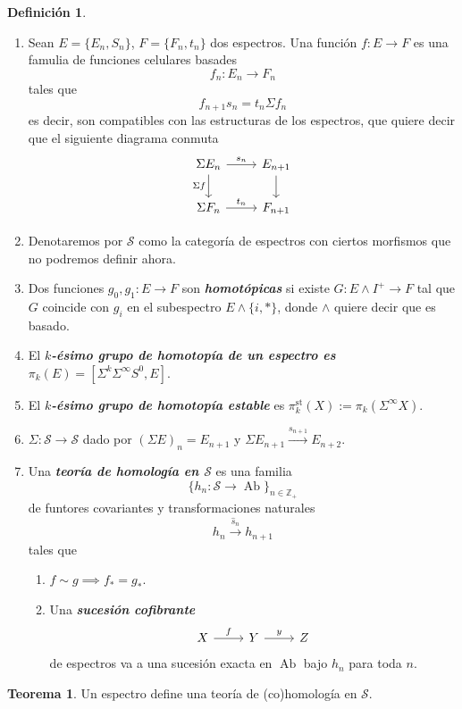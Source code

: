 \documentclass[spanish]{book}
\theoremstyle{definition}
\newtheorem*{defn}{Definición}
\newtheorem*{teo}{Teorema}
\newcommand{\Z}{\mathbb{Z}}
\begin{document}
	\begin{defn}\leavevmode
		\begin{enumerate}
			\item Sean $E=\{ E_n,S_n\}$, $F=\{F_n,t_n\}$ dos espectros. Una función $f:E\to F$ es una famulia de funciones celulares basades
		\[f_n:E_n\to F_n\]
		tales que
		\[f_{n+1}s_n=t_n\Sigma f_n\]
		es decir, son compatibles con las estructuras de los espectros, que quiere decir que el siguiente diagrama conmuta
		\[\begin{tikzcd}
			\Sigma E_n\arrow[d,swap,"\Sigma f"]\arrow[r,"s_n"]&E_{n+1}\arrow[d]\\
			\Sigma F_n\arrow[r,"t_n"]&F_{n+1}
		\end{tikzcd}\]
		\item Denotaremos por $\mathcal{S}$ como la categoría de espectros con ciertos morfismos que no podremos definir ahora.
		\item Dos funciones $g_0,g_1:E\to F$ son \textbf{\textit{homotópicas}} si existe $G:E\wedge I^+\to F$ tal que $G$ coincide con $g_i$ en el subespectro $E\wedge\{i,*\}$, donde $\wedge$ quiere decir que es basado.
		\item El \textbf{\textit{$k$-ésimo grupo de homotopía de un espectro es}} $\pi_k(E)=[\Sigma^k\Sigma^\infty S^0,E]$.
		\item El \textbf{\textit{$k$-ésimo grupo de homotopía estable}} es $\pi^{\operatorname{st}}_k(X):=\pi_k(\Sigma^\infty X)$.
		\item $\Sigma:\mathcal{S}\to \mathcal{S}$ dado por $(\Sigma E)_n=E_{n+1}$ y $\Sigma E_{n+1}\overset{s_{n+1}}{\to}E_{n+2}$.
		\item Una \textbf{\textit{teoría de homología en $\mathcal{S}$}} es una familia
		\[\{h_n:\mathcal{S}\to \operatorname{Ab}\}_{n\in\Z_+}\]
		de funtores covariantes y transformaciones naturales
		\[h_n\overset{\hat{s}_n}{\to}h_{n+1}\]
		tales que
		\begin{enumerate}
			\item $f\sim g\implies f_*=g_*$.
			\item Una \textbf{\textit{sucesión cofibrante}}
			\[\begin{tikzcd}
				X\arrow[r,"f"]&Y\arrow[r,"y"]&Z
			\end{tikzcd}\]
			de espectros va a una sucesión exacta en $\operatorname{Ab}$ bajo $h_n$ para toda $n$.
		\end{enumerate}
		\end{enumerate}
	\end{defn}
	\begin{teo}
		Un espectro define una teoría de (co)homología en $\mathcal{S}$.
	\end{teo}
\end{document}
